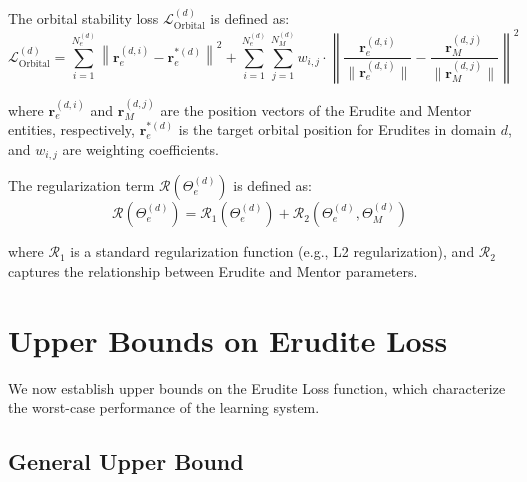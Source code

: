 \begin{definition}
The orbital stability loss $\mathcal{L}_{\text{Orbital}}^{(d)}$ is defined as:
\begin{equation}
\mathcal{L}_{\text{Orbital}}^{(d)} = \sum_{i=1}^{N_e^{(d)}} \left\|\mathbf{r}_e^{(d,i)} - \mathbf{r}_e^{*(d)}\right\|^2 + \sum_{i=1}^{N_e^{(d)}} \sum_{j=1}^{N_M^{(d)}} w_{i,j} \cdot \left\|\frac{\mathbf{r}_e^{(d,i)}}{\|\mathbf{r}_e^{(d,i)}\|} - \frac{\mathbf{r}_M^{(d,j)}}{\|\mathbf{r}_M^{(d,j)}\|}\right\|^2
\end{equation}

where $\mathbf{r}_e^{(d,i)}$ and $\mathbf{r}_M^{(d,j)}$ are the position vectors of the Erudite and Mentor entities, respectively, $\mathbf{r}_e^{*(d)}$ is the target orbital position for Erudites in domain $d$, and $w_{i,j}$ are weighting coefficients.
\end{definition}

\begin{definition}
The regularization term $\mathcal{R}(\Theta_e^{(d)})$ is defined as:
\begin{equation}
\mathcal{R}(\Theta_e^{(d)}) = \mathcal{R}_1(\Theta_e^{(d)}) + \mathcal{R}_2(\Theta_e^{(d)}, \Theta_M^{(d)})
\end{equation}

where $\mathcal{R}_1$ is a standard regularization function (e.g., L2 regularization), and $\mathcal{R}_2$ captures the relationship between Erudite and Mentor parameters.
\end{definition}

\section{Upper Bounds on Erudite Loss}

We now establish upper bounds on the Erudite Loss function, which characterize the worst-case performance of the learning system.

\subsection{General Upper Bound}

